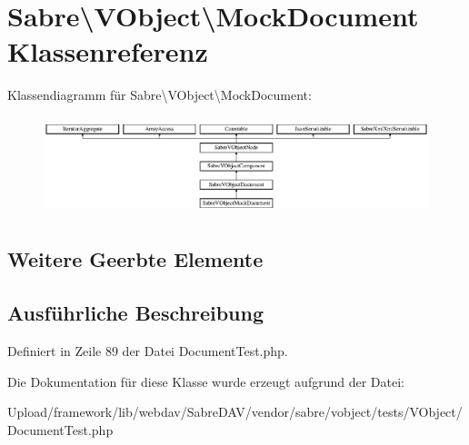 \hypertarget{class_sabre_1_1_v_object_1_1_mock_document}{}\section{Sabre\textbackslash{}V\+Object\textbackslash{}Mock\+Document Klassenreferenz}
\label{class_sabre_1_1_v_object_1_1_mock_document}
Klassendiagramm für Sabre\textbackslash{}V\+Object\textbackslash{}Mock\+Document\+:\begin{figure}[H]
\begin{center}
\leavevmode
\includegraphics[height=2.871795cm]{class_sabre_1_1_v_object_1_1_mock_document}
\end{center}
\end{figure}
\subsection*{Weitere Geerbte Elemente}


\subsection{Ausführliche Beschreibung}


Definiert in Zeile 89 der Datei Document\+Test.\+php.



Die Dokumentation für diese Klasse wurde erzeugt aufgrund der Datei\+:\begin{DoxyCompactItemize}
\item 
Upload/framework/lib/webdav/\+Sabre\+D\+A\+V/vendor/sabre/vobject/tests/\+V\+Object/Document\+Test.\+php\end{DoxyCompactItemize}
